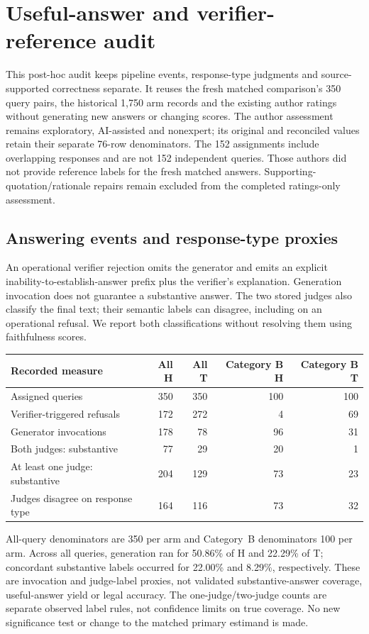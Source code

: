 \section{Useful-answer and verifier-reference audit}
\label{supp:utility-audit}
This post-hoc audit keeps pipeline events, response-type judgments and source-supported correctness separate. It reuses the fresh matched comparison's 350 query pairs, the historical 1,750 arm records and the existing author ratings without generating new answers or changing scores. The author assessment remains exploratory, AI-assisted and nonexpert; its original and reconciled values retain their separate 76-row denominators. The 152 assignments include overlapping responses and are not 152 independent queries. Those authors did not provide reference labels for the fresh matched answers. Supporting-quotation/rationale repairs remain excluded from the completed ratings-only assessment.

\subsection{Answering events and response-type proxies}
An operational verifier rejection omits the generator and emits an explicit inability-to-establish-answer prefix plus the verifier's explanation. Generation invocation does not guarantee a substantive answer. The two stored judges also classify the final text; their semantic labels can disagree, including on an operational refusal. We report both classifications without resolving them using faithfulness scores.

\begin{center}\small
\begin{tabular}{lrrrr}\toprule
Recorded measure & All H & All T & Category B H & Category B T \\
\midrule
Assigned queries & 350 & 350 & 100 & 100 \\
Verifier-triggered refusals & 172 & 272 & 4 & 69 \\
Generator invocations & 178 & 78 & 96 & 31 \\
Both judges: substantive & 77 & 29 & 20 & 1 \\
At least one judge: substantive & 204 & 129 & 73 & 23 \\
Judges disagree on response type & 164 & 116 & 73 & 32 \\
\bottomrule\end{tabular}\end{center}

All-query denominators are 350 per arm and Category~B denominators 100 per arm. Across all queries, generation ran for 50.86\% of H and 22.29\% of T; concordant substantive labels occurred for 22.00\% and 8.29\%, respectively. These are invocation and judge-label proxies, not validated substantive-answer coverage, useful-answer yield or legal accuracy. The one-judge/two-judge counts are separate observed label rules, not confidence limits on true coverage. No new significance test or change to the matched primary estimand is made.

